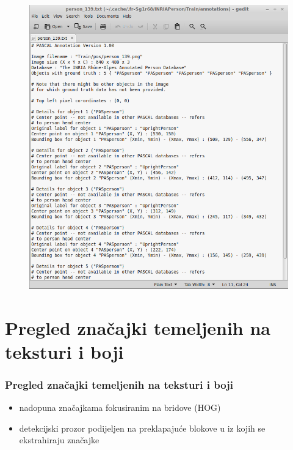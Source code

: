 \documentclass{beamer}
\begin{document}
\begin{frame}
\begin{figure}
\includegraphics[scale=0.3]{img/annot_139.png}
\end{figure}
\end{frame}

\section{Pregled značajki temeljenih na teksturi i boji}
\begin{frame}
\frametitle{Pregled značajki temeljenih na teksturi i boji}
\begin{itemize}
\item nadopuna značajkama fokusiranim na bridove (HOG) \cite{HOG}
\item detekcijski prozor podijeljen na preklapajuće blokove u iz kojih se ekstrahiraju značajke
\end{itemize}
\end{frame}
\end{document}
